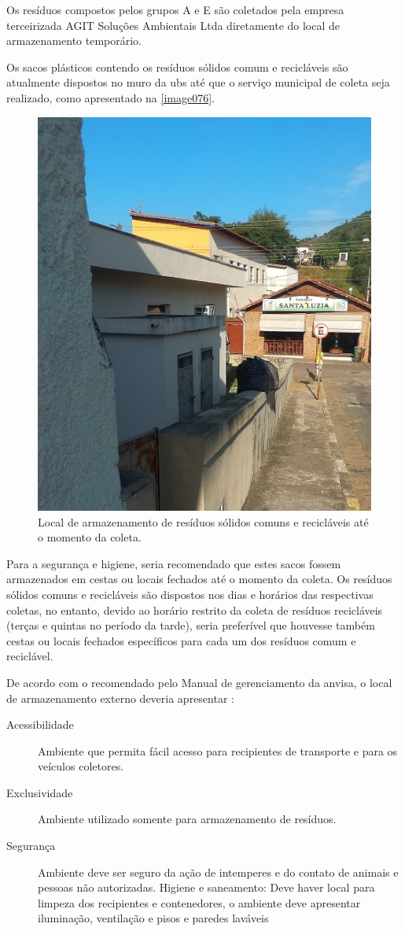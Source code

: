 Os resíduos compostos pelos grupos A e E são coletados pela empresa terceirizada AGIT Soluções Ambientais Ltda diretamente do local de armazenamento temporário.

Os sacos plásticos contendo os resíduos sólidos comum e recicláveis são atualmente dispostos no muro da \gls{ubs} até que o serviço municipal de coleta seja realizado, como apresentado na \autoref{image076}.

\begin{figure}
	\centering
	\includegraphics[width=0.50\linewidth]{produtos/prodtres/image076}
	\caption{Local de armazenamento de resíduos sólidos comuns e recicláveis até o momento da coleta.}
	\label{fig:image076}
\end{figure}


Para a segurança e higiene, seria recomendado que estes sacos fossem armazenados em cestas ou locais fechados até o momento da coleta. Os resíduos sólidos comuns e recicláveis são dispostos nos dias e horários das respectivas coletas, no entanto, devido ao horário restrito da coleta de resíduos recicláveis (terças e quintas no período da tarde), seria preferível que houvesse também cestas ou locais fechados específicos para cada um dos resíduos comum e reciclável.

De acordo com o recomendado pelo Manual de gerenciamento da \gls{anvisa}, o local de armazenamento externo deveria apresentar \cite{anvisa:2006}:

\begin{description}
	\item [Acessibilidade] Ambiente que permita fácil acesso para recipientes de transporte e para os veículos coletores.
	\item[Exclusividade] Ambiente utilizado somente para armazenamento de resíduos.
	\item[Segurança] Ambiente deve ser seguro da ação de intemperes e do contato de animais e pessoas não autorizadas.
	Higiene e saneamento: Deve haver local para limpeza dos recipientes e contenedores, o ambiente deve apresentar iluminação, ventilação e pisos e paredes laváveis
\end{description}

